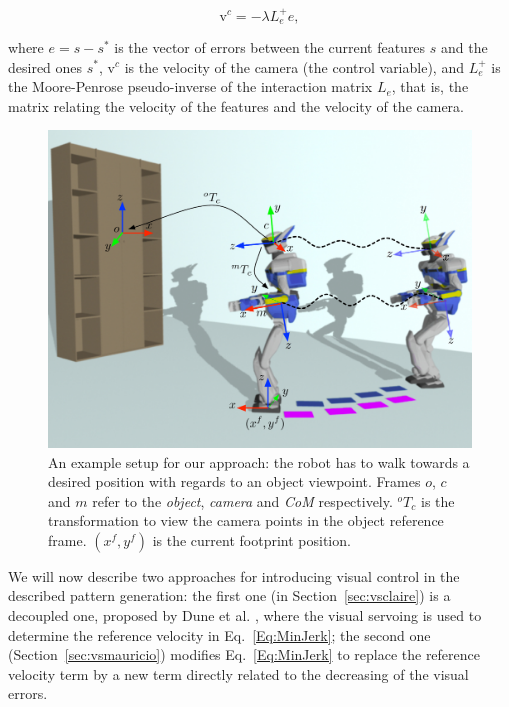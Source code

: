 $$
\text{v}^c = -\lambda {L}_e^{+} {e},
$$

where ${e} = {s}-{s}^{*}$ is the vector of errors between the current features $s$ and the desired ones ${s}^{*}$, $\text{{v}}^c$ is the velocity of the camera (the control variable), and ${L}_e^{+}$ is the Moore-Penrose pseudo-inverse of the interaction matrix ${L}_e$, that is, the matrix relating the velocity of the features and the velocity of the camera.

\begin{figure}[ht] 
\begin{center}
\includegraphics[scale=0.5]{Chap4-Visual-Servoing/schema_new.pdf} 
\caption{ An example setup for our approach: the robot has to walk towards a desired position with regards to an object viewpoint. Frames $o$, $c$ and $m$ refer to the {\it object}, {\it camera} and {\it CoM} respectively. $^o {T}_c$ is the transformation to view the camera points in the object reference frame. $(x^f, y^f)$ is the current footprint position.} 
\label{Fig:Schema}
\end{center}
\end{figure}

We will now describe two approaches for introducing visual control in the described pattern generation: the first one (in Section~\ref{sec:vsclaire}) is a decoupled one, proposed by Dune et al. \citep{DuneIROS2010}, where the visual servoing is used to determine the reference velocity in Eq.~\ref{Eq:MinJerk}; the second one (Section~\ref{sec:vsmauricio}) modifies Eq.~\ref{Eq:MinJerk} to replace the reference velocity term by a new term directly related to the decreasing of the visual errors.


